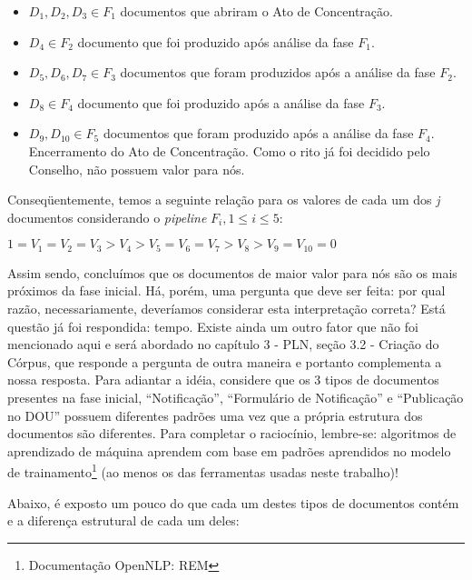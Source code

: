 \documentclass[11pt]{report}
\newcommand{\quotes}[1]{``#1''}
\begin{document}
\begin{itemize}
  \item $D_1, D_2, D_3 \in F_1$ documentos que abriram o Ato de Concentração.
  \item $D_4 \in F_2$ documento que foi produzido após análise da fase $F_1$.
  \item $D_5, D_6, D_7 \in F_3$ documentos que foram produzidos após a análise da fase $F_2$.
  \item $D_8 \in F_4$ documento que foi produzido após a análise da fase $F_3$.
  \item $D_9, D_{10} \in F_5$ documentos que foram produzido após a análise da fase $F_4$. Encerramento do Ato de Concentração. Como o rito já foi decidido pelo Conselho,
  não possuem valor para nós.
\end{itemize}

Conseqüentemente, temos a seguinte relação para os valores de cada um dos \textit{j} documentos considerando o \textit{pipeline} $F_i, 1 \leq i \leq 5$:
\begin{center}
  $1 = V_1 = V_2 = V_3 > V_4 > V_5 = V_6 = V_7 > V_8 > V_9 = V_{10} = 0$
\end{center}

Assim sendo, concluímos que os documentos de maior valor para nós são os mais próximos da fase inicial. Há, porém, uma pergunta que deve ser feita: por qual razão,
necessariamente, deveríamos considerar esta interpretação correta? Está questão já foi respondida: tempo. Existe ainda um outro fator que não foi mencionado aqui e será abordado
no capítulo 3 - PLN, seção 3.2 - Criação do Córpus, que responde a pergunta de outra maneira e portanto complementa a nossa resposta. Para adiantar a idéia, considere que os 3 tipos de
documentos presentes na fase inicial, \quotes{Notificação}, \quotes{Formulário de Notificação} e \quotes{Publicação no DOU} possuem diferentes padrões uma vez que a própria
estrutura dos documentos são diferentes. Para completar o raciocínio, lembre-se: algoritmos de aprendizado de máquina aprendem com base em padrões aprendidos no modelo
de trainamento\footnote[5]{Documentação OpenNLP: REM} (ao menos os das ferramentas usadas neste trabalho)!

Abaixo, é exposto um pouco do que cada um destes tipos de documentos contém e a diferença estrutural de cada um deles:
\end{document}
